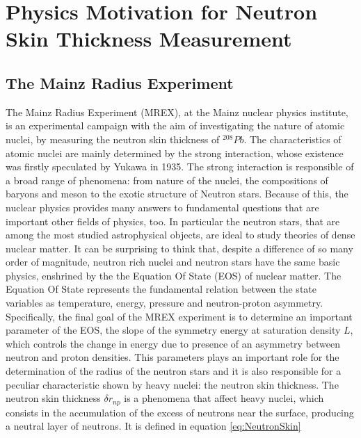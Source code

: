 
\chapter{Physics Motivation for Neutron Skin Thickness Measurement} \label{intro}

\section{The Mainz Radius Experiment}

The Mainz Radius Experiment (MREX), at the Mainz nuclear physics institute, is an experimental campaign with the aim of investigating the nature of atomic nuclei, by measuring the neutron skin thickness of $^{208}Pb$. The characteristics of atomic nuclei are mainly determined by the strong interaction, whose existence was firstly speculated by Yukawa in 1935. The strong interaction is responsible of a broad range of phenomena: from nature of the nuclei, the compositions of baryons and meson to the exotic structure of Neutron stars. Because of this, the nuclear physics provides many answers to fundamental questions that are important other fields of physics, too. In particular the neutron stars, that are among the most studied astrophysical objects, are ideal to study theories of dense nuclear matter. 
It can be surprising to think that, despite a difference of so many order of magnitude, neutron rich nuclei and neutron stars have the same basic physics, enshrined by the the Equation Of State (EOS) of nuclear matter. The Equation Of State represents the fundamental relation between the state variables as temperature, energy, pressure and neutron-proton asymmetry. Specifically, the final goal of the MREX experiment is to determine an important parameter of the EOS, the slope of the symmetry energy at saturation density $L$, which controls the change in energy due to presence of an asymmetry between neutron and proton densities. This parameters plays an important role for the determination of the radius of the neutron stars and it is also responsible for a peculiar characteristic shown by heavy nuclei: the neutron skin thickness. The neutron skin thickness $\delta r_{np}$ is a phenomena that affect heavy nuclei, which consists in the accumulation of the excess of neutrons near the surface, producing a neutral layer of neutrons. It is defined in equation \ref{eq:NeutronSkin}

